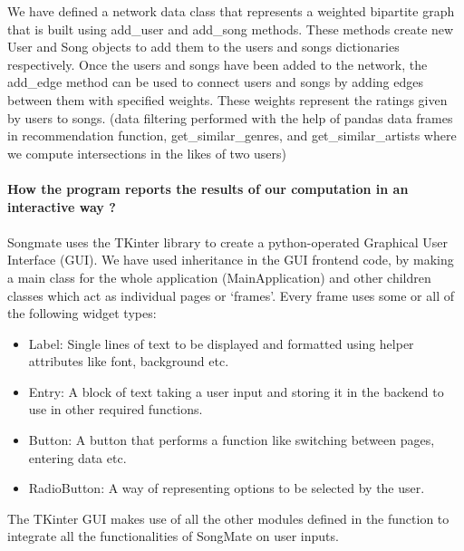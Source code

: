 \documentclass[fontsize=11pt]{article}
\begin{document}
We have defined a network data class that represents a weighted bipartite graph that is built using add\_user and add\_song methods. These methods create new User and Song objects to add them to the users and songs dictionaries respectively. Once the users and songs have been added to the network, the add\_edge method can be used to connect users and songs by adding edges between them with specified weights. These weights represent the ratings given by users to songs.
(data filtering performed with the help of pandas data frames in recommendation function, get\_similar\_genres, and get\_similar\_artists where we compute intersections in the likes of two users)
\\\\
\textbf{How the program reports the results of our computation in an interactive way ?}
\\\\
Songmate uses the TKinter library to create a python-operated Graphical User Interface (GUI). We have used inheritance in the GUI frontend code, by making a main class for the whole application (MainApplication) and other children classes which act as individual pages or ‘frames’. Every frame uses some or all of the following widget types:
\begin{itemize}
    \item Label: Single lines of text to be displayed and formatted using helper attributes like font, background etc.
    \item Entry: A block of text taking a user input and storing it in the backend to use in other required functions.
    \item Button: A button that performs a function like switching between pages, entering data etc.
    \item RadioButton: A way of representing options to be selected by the user.
\end{itemize}

The TKinter GUI makes use of all the other modules defined in the function to integrate all the functionalities of SongMate on user inputs. 
\end{document}
